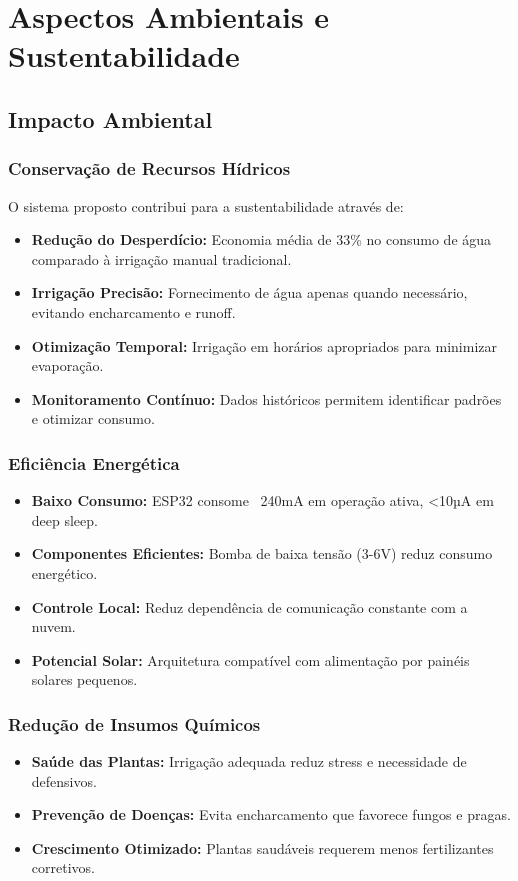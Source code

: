 \documentclass[twoside,english,brazilian]{UNISINOSmonografia}
\begin{document}
\chapter{Aspectos Ambientais e Sustentabilidade}

\section{Impacto Ambiental}

\subsection{Conservação de Recursos Hídricos}
O sistema proposto contribui para a sustentabilidade através de:
\begin{itemize}
    \item \textbf{Redução do Desperdício:} Economia média de 33\% no consumo de água comparado à irrigação manual tradicional.
    \item \textbf{Irrigação Precisão:} Fornecimento de água apenas quando necessário, evitando encharcamento e runoff.
    \item \textbf{Otimização Temporal:} Irrigação em horários apropriados para minimizar evaporação.
    \item \textbf{Monitoramento Contínuo:} Dados históricos permitem identificar padrões e otimizar consumo.
\end{itemize}

\subsection{Eficiência Energética}
\begin{itemize}
    \item \textbf{Baixo Consumo:} ESP32 consome ~240mA em operação ativa, <10µA em deep sleep.
    \item \textbf{Componentes Eficientes:} Bomba de baixa tensão (3-6V) reduz consumo energético.
    \item \textbf{Controle Local:} Reduz dependência de comunicação constante com a nuvem.
    \item \textbf{Potencial Solar:} Arquitetura compatível com alimentação por painéis solares pequenos.
\end{itemize}

\subsection{Redução de Insumos Químicos}
\begin{itemize}
    \item \textbf{Saúde das Plantas:} Irrigação adequada reduz stress e necessidade de defensivos.
    \item \textbf{Prevenção de Doenças:} Evita encharcamento que favorece fungos e pragas.
    \item \textbf{Crescimento Otimizado:} Plantas saudáveis requerem menos fertilizantes corretivos.
\end{itemize}
\end{document}
